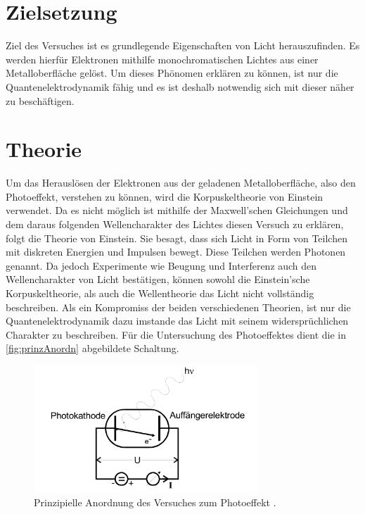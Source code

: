\section{Zielsetzung}
\label{sec:ziel}

Ziel des Versuches ist es grundlegende Eigenschaften von Licht herauszufinden. Es werden hierfür
Elektronen mithilfe monochromatischen Lichtes aus einer Metalloberfläche gelöst.
Um dieses Phönomen erklären zu können, ist nur die Quantenelektrodynamik fähig und es ist deshalb notwendig sich mit dieser
näher zu beschäftigen.

\section{Theorie}
\label{sec:Theorie}

Um das Herauslösen der Elektronen aus der geladenen Metalloberfläche, also den Photoeffekt, verstehen zu können, wird die Korpuskeltheorie von Einstein verwendet.
Da es nicht möglich ist mithilfe der Maxwell'schen Gleichungen und dem daraus folgenden Wellencharakter des Lichtes diesen Versuch zu erklären, folgt
die Theorie von Einstein. Sie besagt, dass sich Licht in Form von Teilchen mit diskreten Energien und Impulsen bewegt. Diese Teilchen werden Photonen genannt.
Da jedoch Experimente wie Beugung und Interferenz auch den Wellencharakter von Licht bestätigen, können sowohl die Einstein'sche Korpuskeltheorie, als auch
die Wellentheorie das Licht nicht vollständig beschreiben. Als ein Kompromiss der beiden verschiedenen Theorien, ist nur die Quantenelektrodynamik dazu
imstande das Licht mit seinem widersprüchlichen Charakter zu beschreiben.\newline
Für die Untersuchung des Photoeffektes dient die in \autoref{fig:prinzAnordn} abgebildete Schaltung.

\begin{figure}[H]
    \centering
    \includegraphics[width = 0.75\textwidth]{data/prinzAnordnung.png}
    \caption{Prinzipielle Anordnung des Versuches zum Photoeffekt \cite{Anleitung500}.}
    \label{fig:prinzAnordn}
\end{figure}

